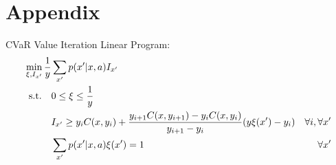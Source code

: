 \chapter{Appendix}
CVaR Value Iteration Linear Program:
\begin{equation}\label{eqn:cvarvilp}
\begin{split}
\min_{\xi, I_{x'}} \dfrac{1}{y} &\sum_{x'} p(x'|x, a) I_{x'}
\\
\textup{s.t.} \quad
&0 \le \xi \le \dfrac{1}{y}\\
&I_{x'} \ge y_iC(x,y_{i})+\frac{y_{i+1}C(x,y_{i+1})-y_iC(x,y_{i})}{y_{i+1}-y_i}(y\xi(x')-y_i) &\forall i, \forall x'\\
&\sum_{x'} p(x'|x, a)\xi(x') = 1 &\forall x'
\end{split}
\end{equation}

